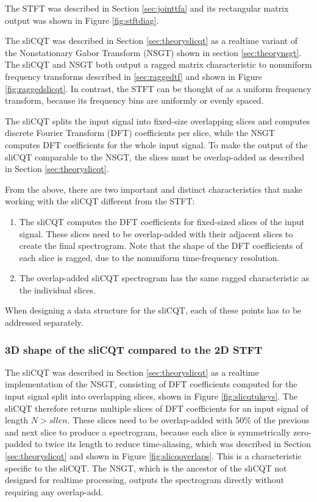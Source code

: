 \documentclass[report.tex]{subfiles}
\begin{document}
The STFT was described in Section \ref{sec:jointtfa} and its rectangular matrix output was shown in Figure \ref{fig:stftdiag}.

The sliCQT was described in Section \ref{sec:theoryslicqt} as a realtime variant of the Nonstationary Gabor Transform (NSGT) shown in section \ref{sec:theorynsgt}. The sliCQT and NSGT both output a ragged matrix characteristic to nonuniform frequency transforms described in \ref{sec:raggedtf} and shown in Figure \ref{fig:raggedslicqt}. In contrast, the STFT can be thought of as a uniform frequency transform, because its frequency bins are uniformly or evenly spaced.

The sliCQT splits the input signal into fixed-size overlapping slices and computes discrete Fourier Transform (DFT) coefficients per slice, while the NSGT computes DFT coefficients for the whole input signal. To make the output of the sliCQT comparable to the NSGT, the slices must be overlap-added as described in Section \ref{sec:theoryslicqt}.

From the above, there are two important and distinct characteristics that make working with the sliCQT different from the STFT:
\begin{enumerate}
	\item
		The sliCQT computes the DFT coefficients for fixed-sized slices of the input signal. These slices need to be overlap-added with their adjacent slices to create the final spectrogram. Note that the shape of the DFT coefficients of each slice is ragged, due to the nonuniform time-frequency resolution.
	\item
		The overlap-added sliCQT spectrogram has the same ragged characteristic as the individual slices.
\end{enumerate}

When designing a data structure for the sliCQT, each of these points has to be addressed separately. 

\subsubsection{3D shape of the sliCQT compared to the 2D STFT}
\label{sec:stftslicqtcomp1}

The sliCQT was described in Section \ref{sec:theoryslicqt} as a realtime implementation of the NSGT, consisting of DFT coefficients computed for the input signal split into overlapping slices, shown in Figure \ref{fig:slicqtukeys}. The sliCQT therefore returns multiple slices of DFT coefficients for an input signal of length $N > sllen$. These slices need to be overlap-added with 50\% of the previous and next slice to produce a spectrogram, because each slice is symmetrically zero-padded to twice its length to reduce time-aliasing, which was described in Section \ref{sec:theoryslicqt} and shown in Figure \ref{fig:slicqoverlaps}. This is a characteristic specific to the sliCQT. The NSGT, which is the ancestor of the sliCQT not designed for realtime processing, outputs the spectrogram directly without requiring any overlap-add.
\end{document}
